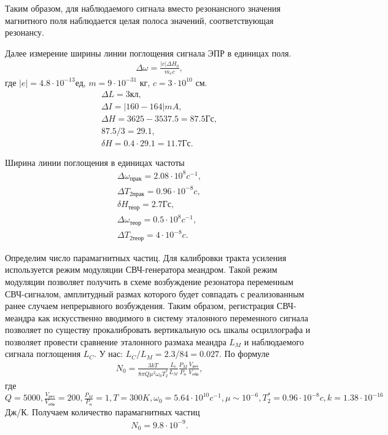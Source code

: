 Таким образом, для наблюдаемого сигнала вместо резонансного значения магнитного поля наблюдается целая полоса значений, соответствующая резонансу. 

Далее измерение ширины линии поглощения сигнала ЭПР в единицах поля. 
\begin{gather*}
 	\Delta \omega=\frac{|e|\Delta H_0}{m_e c},
\end{gather*}
где $|e|=4.8 \cdot 10^{-13}$ед, $m=9 \cdot 10^{-31}$ кг, $c=3 \cdot 10^{10}$ см. 
\begin{gather*}
 	\Delta L=3 \text{кл}, \\
 	\Delta I= |160-164| mA, \\
 	\Delta H= 3625-3537.5=87.5 \text{Гс}, \\
 	87.5 / 3 = 29.1, \\
 	\delta H = 0.4 \cdot 29.1 = 11.7 \text{Гс}.
\end{gather*}

Ширина линии поглощения в единицах частоты
\begin{gather*}
 	\Delta \omega_{\text{прак}}=2.08 \cdot 10^{8} c^{-1}, \\
 	\Delta T_{\text{2прак}} = 0.96 \cdot 10^{-8} c, \\
 	\delta H_{\text{теор}}= 2.7 \text{Гс}, \\
 	\Delta \omega_{\text{теор}}= 0.5 \cdot 10^{8} c^{-1}, \\
 	\Delta T_{\text{2теор}} = 4 \cdot 10^{-8} c.
\end{gather*}

Определим число парамагнитных частиц. Для калибровки тракта усиления используется режим модуляции СВЧ-генератора меандром. Такой режим модуляции позволяет получить в схеме возбуждение резонатора переменным СВЧ-сигналом, амплитудный размах которого будет совпадать с реализованным ранее случаем непрерывного возбуждения. Таким образом, регистрация СВЧ-меандра как искусственно вводимого в систему эталонного переменного сигнала позволяет по существу прокалибровать вертикальную ось шкалы осциллографа и позволяет провести сравнение эталонного размаха меандра $L_M$ и наблюдаемого сигнала поглощения $L_C$. У нас: $L_C/L_M=2.3/84=0.027$. По формуле
\begin{gather*}
 	N_0=\frac{3kT}{8\pi Q \mu^2\omega_0 T_2^*}\frac{L_c}{L_M}\frac{P_M}{P_{\text{п}}}\frac{V_\text{рез}}{V_\text{обр}},
\end{gather*}
где $Q=5000, \frac{V_\text{рез}}{V_\text{обр}}=200, \frac{P_M}{P_{\text{п}}}=1, T=300 K, \omega_0=5.64 \cdot 10^{10} c^{-1}, \mu \sim 10^{-6}, T_2^* = 0.96 \cdot 10^{-8} c, k=1.38 \cdot 10^{-16}$ Дж/К. Получаем количество парамагнитных частиц
\begin{gather*}
 	N_0=9.8 \cdot 10^{-9}.
\end{gather*}

